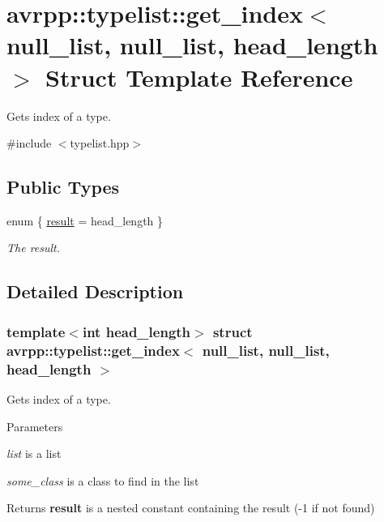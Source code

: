 \hypertarget{structavrpp_1_1typelist_1_1get__index_3_01null__list_00_01null__list_00_01head__length_01_4}{
\section{avrpp::typelist::get\_\-index$<$ null\_\-list, null\_\-list, head\_\-length $>$ Struct Template Reference}
\label{structavrpp_1_1typelist_1_1get__index_3_01null__list_00_01null__list_00_01head__length_01_4}
}


Gets index of a type.  




{\ttfamily \#include $<$typelist.hpp$>$}

\subsection*{Public Types}
\begin{DoxyCompactItemize}
\item 
enum \{ \hyperlink{structavrpp_1_1typelist_1_1get__index_3_01null__list_00_01null__list_00_01head__length_01_4_a936be944afd362bad4c4cced06548dcaaae13e0da7aae7b42027b44c1641419f9}{result} = head\_\-length
 \}
\begin{DoxyCompactList}\small\item\em The result. \item\end{DoxyCompactList}\end{DoxyCompactItemize}


\subsection{Detailed Description}
\subsubsection*{template$<$int head\_\-length$>$ struct avrpp::typelist::get\_\-index$<$ null\_\-list, null\_\-list, head\_\-length $>$}

Gets index of a type. 
\begin{DoxyParams}{Parameters}
\item[{\em list}]is a list \item[{\em some\_\-class}]is a class to find in the list \end{DoxyParams}
\begin{DoxyReturn}{Returns}
{\bfseries result} is a nested constant containing the result (-\/1 if not found) 
\end{DoxyReturn}


